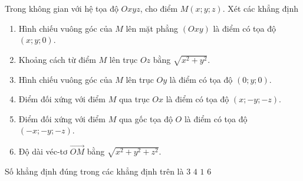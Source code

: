 	\begin{ex}%
		Trong không gian với hệ tọa độ $Oxyz$, cho điểm $M(x;y;z)$. Xét các khẳng định
		\begin{enumerate}
			
		\item Hình chiếu vuông góc của $M$ lên mặt phẳng $(Oxy)$ là điểm có tọa độ $(x;y;0)$.
		\item Khoảng cách từ điểm $M$ lên trục $Oz$ bằng $\sqrt{x^2+y^2}$.
		\item Hình chiếu vuông góc của $M$ lên trục $Oy$ là điểm có tọa độ $(0;y;0)$.
		\item Điểm đối xứng với điểm $M$ qua trục $Ox$ là điểm có tọa độ $(x;-y;-z)$.
		\item Điểm đối xứng với điểm $M$ qua gốc tọa độ $O$ là điểm có tọa độ $(-x;-y;-z)$.
		\item Độ dài véc-tơ $\overrightarrow{OM}$ bằng $\sqrt{x^2+y^2+z^2}$.
		\end{enumerate}
		Số khẳng định đúng trong các khẳng định trên là
		\choice
		{$3$}
		{$4$}
		{$1$}
		{\True $6$}
	\end{ex}
